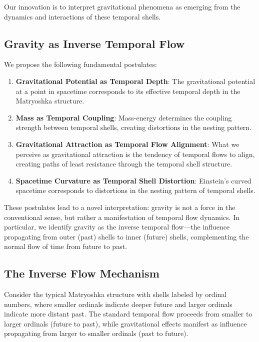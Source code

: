 \documentclass[12pt,a4paper]{article}
\begin{document}
Our innovation is to interpret gravitational phenomena as emerging from the dynamics and interactions of these temporal shells.

\subsection{Gravity as Inverse Temporal Flow}

We propose the following fundamental postulates:

\begin{enumerate}
    \item \textbf{Gravitational Potential as Temporal Depth}: The gravitational potential at a point in spacetime corresponds to its effective temporal depth in the Matryoshka structure.
    
    \item \textbf{Mass as Temporal Coupling}: Mass-energy determines the coupling strength between temporal shells, creating distortions in the nesting pattern.
    
    \item \textbf{Gravitational Attraction as Temporal Flow Alignment}: What we perceive as gravitational attraction is the tendency of temporal flows to align, creating paths of least resistance through the temporal shell structure.
    
    \item \textbf{Spacetime Curvature as Temporal Shell Distortion}: Einstein's curved spacetime corresponds to distortions in the nesting pattern of temporal shells.
\end{enumerate}

These postulates lead to a novel interpretation: gravity is not a force in the conventional sense, but rather a manifestation of temporal flow dynamics. In particular, we identify gravity as the inverse temporal flow—the influence propagating from outer (past) shells to inner (future) shells, complementing the normal flow of time from future to past.

\subsection{The Inverse Flow Mechanism}

Consider the typical Matryoshka structure with shells labeled by ordinal numbers, where smaller ordinals indicate deeper future and larger ordinals indicate more distant past. The standard temporal flow proceeds from smaller to larger ordinals (future to past), while gravitational effects manifest as influence propagating from larger to smaller ordinals (past to future).
\end{document}
